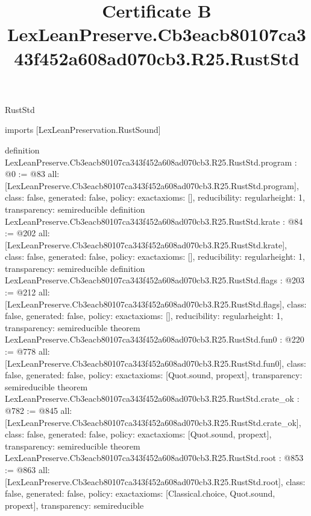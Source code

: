 \begin{lexlean}{RustStd}
\title{Certificate B LexLeanPreserve.Cb3eacb80107ca343f452a608ad070cb3.R25.RustStd}
\begin{coremodule}
imports [LexLeanPreservation.RustSound]

definition LexLeanPreserve.Cb3eacb80107ca343f452a608ad070cb3.R25.RustStd.program : @0 := @83 {
  all: [LexLeanPreserve.Cb3eacb80107ca343f452a608ad070cb3.R25.RustStd.program],
  class: false,
  generated: false,
  policy: exact{axioms: []},
  reducibility: regular{height: 1},
  transparency: semireducible
}
definition LexLeanPreserve.Cb3eacb80107ca343f452a608ad070cb3.R25.RustStd.krate : @84 := @202 {
  all: [LexLeanPreserve.Cb3eacb80107ca343f452a608ad070cb3.R25.RustStd.krate],
  class: false,
  generated: false,
  policy: exact{axioms: []},
  reducibility: regular{height: 1},
  transparency: semireducible
}
definition LexLeanPreserve.Cb3eacb80107ca343f452a608ad070cb3.R25.RustStd.flags : @203 := @212 {
  all: [LexLeanPreserve.Cb3eacb80107ca343f452a608ad070cb3.R25.RustStd.flags],
  class: false,
  generated: false,
  policy: exact{axioms: []},
  reducibility: regular{height: 1},
  transparency: semireducible
}
theorem LexLeanPreserve.Cb3eacb80107ca343f452a608ad070cb3.R25.RustStd.fun0 : @220 := @778 {
  all: [LexLeanPreserve.Cb3eacb80107ca343f452a608ad070cb3.R25.RustStd.fun0],
  class: false,
  generated: false,
  policy: exact{axioms: [Quot.sound, propext]},
  transparency: semireducible
}
theorem LexLeanPreserve.Cb3eacb80107ca343f452a608ad070cb3.R25.RustStd.crate_ok : @782 := @845 {
  all: [LexLeanPreserve.Cb3eacb80107ca343f452a608ad070cb3.R25.RustStd.crate_ok],
  class: false,
  generated: false,
  policy: exact{axioms: [Quot.sound, propext]},
  transparency: semireducible
}
theorem LexLeanPreserve.Cb3eacb80107ca343f452a608ad070cb3.R25.RustStd.root : @853 := @863 {
  all: [LexLeanPreserve.Cb3eacb80107ca343f452a608ad070cb3.R25.RustStd.root],
  class: false,
  generated: false,
  policy: exact{axioms: [Classical.choice, Quot.sound, propext]},
  transparency: semireducible
}


\end{coremodule}
\end{lexlean}
